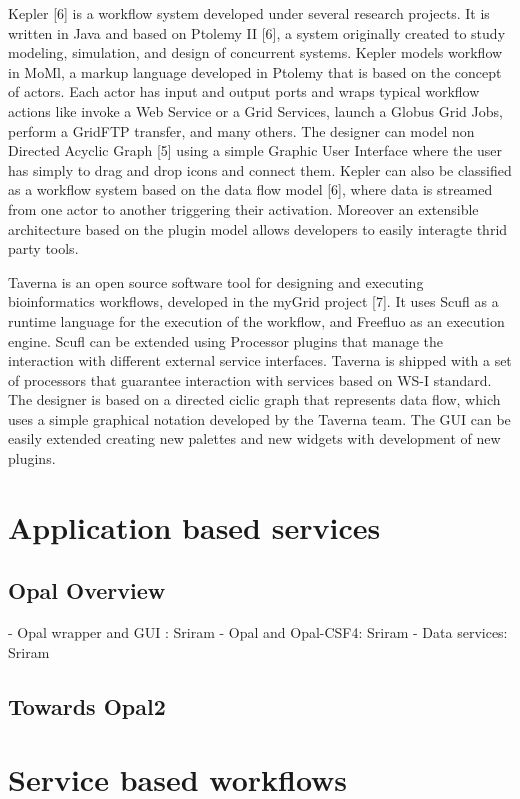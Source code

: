 \documentclass[conference]{IEEEtran}
\begin{document}
Kepler [6] is a workflow system developed under several research projects.
It is written in Java and based on Ptolemy II [6], a system originally
created to study modeling, simulation, and design of concurrent systems.
Kepler models workflow in MoMl, a markup language developed in Ptolemy that
is based on the concept of actors. Each actor has input and output ports
and wraps typical workflow actions like invoke a Web Service or a Grid
Services, launch a Globus Grid Jobs, perform a GridFTP transfer, and many
others. The designer can model non Directed Acyclic Graph [5] using a
simple Graphic User Interface where the user has simply to drag and drop
icons and connect them.  Kepler can also be classified as a workflow system
based on the data flow model [6], where data is streamed from one actor to
another triggering their activation. Moreover an extensible architecture
based on the plugin model allows developers to easily interagte thrid party
tools.

Taverna is an open source software tool for designing and executing
bioinformatics workflows, developed in the myGrid project [7]. It uses
Scufl as a runtime language for the execution of the workflow, and Freefluo
as an execution engine. Scufl can be extended using Processor plugins that
manage the interaction with different external service interfaces. Taverna
is shipped with a set of processors that guarantee interaction with
services based on WS-I standard. The designer is based on a directed ciclic
graph that represents data flow, which uses a simple graphical notation
developed by the Taverna team. The GUI can be easily extended creating new
palettes and new widgets with development of new plugins.

\section {Application based services}

\subsection {Opal Overview}

- Opal wrapper and GUI \cite{opal}: Sriram 
- Opal and Opal-CSF4: Sriram
- Data services: Sriram

\subsection {Towards Opal2}

\section {Service based workflows}
\end{document}
